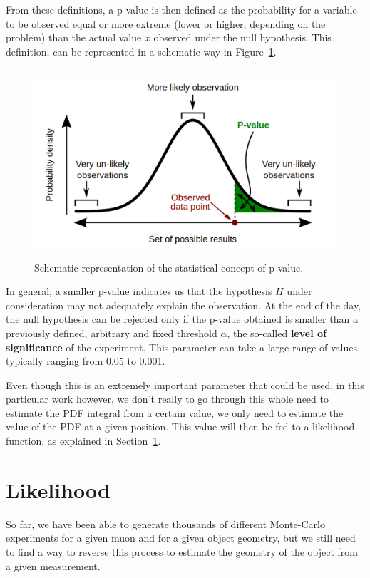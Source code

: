 \documentclass[a4paper, 11pt]{report}
\begin{document}
From these definitions, a p-value is then defined as the probability for a variable to be observed equal or more extreme (lower or higher, depending on the problem) than the actual value $x$ observed under the null hypothesis. This definition, can be represented in a schematic way in Figure~\ref{fig:pvalue}.

\begin{figure}[htbp]
\centering
\includegraphics[width=13cm, height=7cm]{figs/pvalue.png}
\caption{Schematic representation of the statistical concept of p-value.}
\label{fig:pvalue}
\end{figure}

In general, a smaller p-value indicates us that the hypothesis $H$ under consideration may not adequately explain the observation. At the end of the day, the null hypothesis can be rejected only if the p-value obtained is smaller than a previously defined, arbitrary and fixed threshold $\alpha$, the so-called \textbf{level of significance} of the experiment. This parameter can take a large range of values, typically ranging from 0.05 to 0.001.

Even though this is an extremely important parameter that could be used, in this particular work however, we don't really to go through this whole need to estimate the PDF integral from a certain value, we only need to estimate the value of the PDF at a given position. This value will then be fed to a likelihood function, as explained in Section~\ref{sec:Likelihood}.

\section{Likelihood} \label{sec:Likelihood}

So far, we have been able to generate thousands of different Monte-Carlo experiments for a given muon and for a given object geometry, but we still need to find a way to reverse this process to estimate the geometry of the object from a given measurement. 
\end{document}
